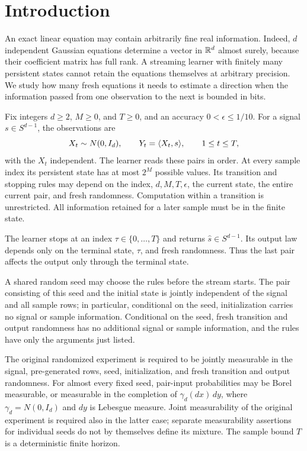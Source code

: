 \section{Introduction}\label{s:introduction}

An exact linear equation may contain arbitrarily fine real information.
Indeed, \(d\) independent Gaussian equations determine a vector in
\(\mathbb R^d\) almost surely, because their coefficient matrix has full rank.
A streaming learner with finitely many persistent states cannot retain
the equations themselves at arbitrary precision. We study how many
fresh equations it needs to estimate a direction when the information
passed from one observation to the next is bounded in bits.

\begin{definition}\label{s:model}
Fix integers \(d\ge2\), \(M\ge0\), and \(T\ge0\), and an accuracy
\(0<\epsilon\le1/10\). For a signal \(s\in S^{d-1}\), the observations
are
\[
 X_t\sim N(0,I_d),\qquad Y_t=\langle X_t,s\rangle,\qquad 1\le t\le T,
\]
with the \(X_t\) independent. The learner reads these pairs in order.
At every sample index its persistent state has at most \(2^M\) possible
values. Its transition and stopping rules may depend on the index,
\(d,M,T,\epsilon\), the current state, the entire current pair, and
fresh randomness. Computation within a transition is unrestricted.
All information retained for a later sample must be in the finite state.

The learner stops at an index \(\tau\in\{0,\ldots,T\}\) and returns
\(\widehat s\in S^{d-1}\). Its output law depends only on the terminal
state, \(\tau\), and fresh randomness. Thus the last pair affects the
output only through the terminal state.

A shared random seed may choose the rules before the stream starts. The pair consisting of this seed
and the initial state is jointly independent of the signal and all
sample rows; in particular, conditional on the seed, initialization
carries no signal or sample information. Conditional on the seed,
fresh transition and output randomness has no additional signal or
sample information, and the rules have only the arguments just listed.

The original randomized experiment is required to be jointly
measurable in the signal, pre-generated rows, seed, initialization,
and fresh transition and output randomness. For almost every fixed
seed, pair-input probabilities may be Borel measurable, or measurable
in the completion of
\(\gamma_d(dx)\,dy\), where \(\gamma_d=N(0,I_d)\) and \(dy\) is
Lebesgue measure. Joint measurability of the original experiment is
required also in the latter case; separate measurability assertions
for individual seeds do not by themselves define its mixture.
The sample bound \(T\) is a deterministic finite horizon.
\end{definition}

